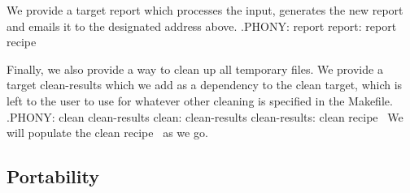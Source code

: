 We provide a target {\Tt{}report\nwendquote} which processes the input, generates the new 
report and emails it to the designated address above.
\nwenddocs{}\endmoddef\nwstartdeflinemarkup{}\nwenddeflinemarkup
.PHONY: report
report:
  \LA{}report recipe~{\nwtagstyle{}}\RA{}
\nwendcode{}\nwdocspar

Finally, we also provide a way to clean up all temporary files.
We provide a target {\Tt{}clean-results\nwendquote} which we add as a dependency to the 
{\Tt{}clean\nwendquote} target, which is left to the user to use for whatever other cleaning 
is specified in the {\Tt{}Makefile\nwendquote}.
\nwenddocs{}\plusendmoddef\nwstartdeflinemarkup{}\nwenddeflinemarkup
.PHONY: clean clean-results
clean: clean-results
clean-results:
  \LA{}clean recipe~{\nwtagstyle{}}\RA{}
\nwendcode{}We will populate the {\Tt{}\LA{}clean recipe~{\nwtagstyle{}}\RA{}\nwendquote} as we go.

\subsection{Portability}

